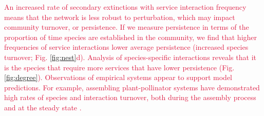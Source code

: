 \documentclass[twocolumn,preprintnumbers,amsmath,amssymb,superscriptaddress,linenumbers]{revtex4-1}
\newcommand{\rev}[1]{\textcolor{crimson}{#1}}
\begin{document}

\rev{An increased rate of secondary extinctions with service interaction frequency means that the network is less robust to perturbation, which may impact community turnover, or persistence.
If we measure persistence in terms of the proportion of time species are established in the community, we find that higher frequencies of service interactions lower average persistence (increased species turnover; Fig. \ref{fig:nest}d).
Analysis of species-specific interactions reveals that it is the species that require more services that have lower persistence (Fig. \ref{fig:degree}).
Observations of empirical systems appear to support model predictions.
For example, assembling plant-pollinator systems have demonstrated high rates of species and interaction turnover, both during the assembly process and at the steady state \cite{Ponisio2017}.}
\end{document}
